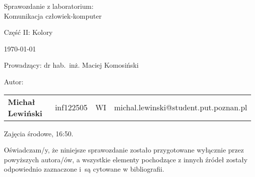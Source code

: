 \thispagestyle{empty} %

\begin{center}
{\large{Sprawozdanie z laboratorium:\\
Komunikacja człowiek-komputer\\
}}

\vspace{3ex}

Część II: Kolory

\vspace{3ex}
{\footnotesize\today}

\end{center}


\vspace{10ex}

Prowadzący: dr hab.~inż. Maciej Komosiński

\vspace{5ex}

Autor:
\begin{tabular}{lllr}
\textbf{Michał Lewiński} & inf122505 & WI & michal.lewinski@student.put.poznan.pl \\
\end{tabular}

\vspace{5ex}

Zajęcia środowe, 16:50.

\vspace{35ex}

\noindent Oświadczam/y, że niniejsze sprawozdanie zostało przygotowane wyłącznie przez powyższych autora/ów,
a wszystkie elementy pochodzące z innych źródeł zostały odpowiednio zaznaczone i~są cytowane w bibliografii.

\newpage
